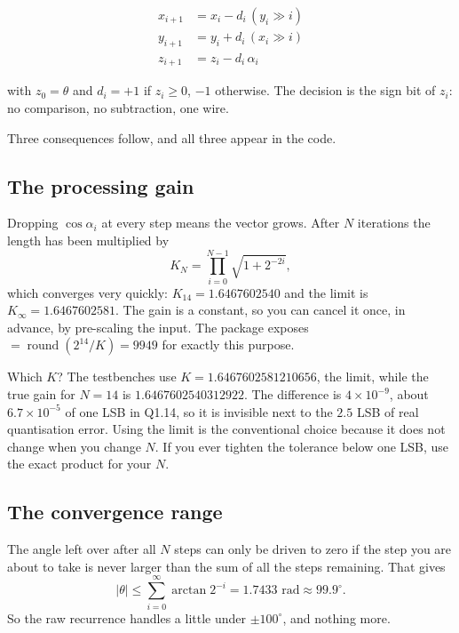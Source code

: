 \begin{align}
  x_{i+1} &= x_i - d_i \, (y_i \gg i) \label{eq:case:x}\\
  y_{i+1} &= y_i + d_i \, (x_i \gg i) \label{eq:case:y}\\
  z_{i+1} &= z_i - d_i \, \alpha_i    \label{eq:case:z}
\end{align}

with $z_0 = \theta$ and $d_i = +1$ if $z_i \ge 0$, $-1$ otherwise. The
decision is the sign bit of $z_i$: no comparison, no subtraction, one wire.

Three consequences follow, and all three appear in the code.

\subsection{The processing gain}

Dropping $\cos\alpha_i$ at every step means the vector grows. After $N$
iterations the length has been multiplied by
\[
  K_N = \prod_{i=0}^{N-1} \sqrt{1 + 2^{-2i}} ,
\]
which converges very quickly: $K_{14} = 1.6467602540$ and the limit is
$K_\infty = 1.6467602581$. The gain is a constant, so you can cancel it once,
in advance, by pre-scaling the input. The package exposes
 $= \operatorname{round}(2^{14}/K) = 9949$ for exactly this
purpose.

\begin{notebox}{Which $K$?}
The testbenches use $K = 1.6467602581210656$, the limit, while the true gain
for $N = 14$ is $1.6467602540312922$. The difference is $4 \times 10^{-9}$,
about $6.7\times10^{-5}$ of one LSB in Q1.14, so it is invisible next to the
$2.5$ LSB of real quantisation error. Using the limit is the conventional
choice because it does not change when you change $N$. If you ever tighten
the tolerance below one LSB, use the exact product for your $N$.
\end{notebox}

\subsection{The convergence range}

The angle left over after all $N$ steps can only be driven to zero if the
step you are about to take is never larger than the sum of all the steps
remaining. That gives
\[
  |\theta| \le \sum_{i=0}^{\infty} \arctan 2^{-i} = 1.7433 \text{ rad}
  \approx 99.9^\circ .
\]
So the raw recurrence handles a little under $\pm100^\circ$, and nothing more.

